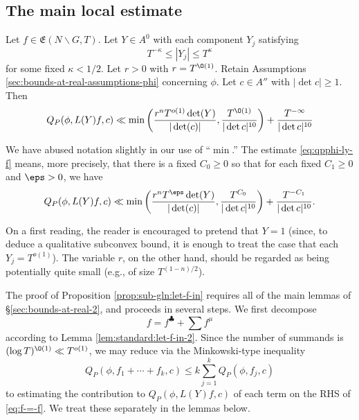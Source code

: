 \subsection{The main local estimate}\label{sec:20230514074956}

\begin{proposition}\label{prop:sub-gln:let-f-in}
  Let $f \in \mathfrak{E}(N \backslash G, T)$.  Let $Y \in A^0$ with each component $Y_j$ satisfying
  \begin{equation}\label{eq:t-kappa-leq}
    T^{-\kappa} \leq |Y_j| \leq T^{\kappa}
  \end{equation}
  for some fixed $\kappa < 1/2$.  Let $r > 0$ with $r = T^{\O(1)}$.  Retain Assumptions \ref{sec:bounds-at-real-assumptions-phi} concerning $\phi$.  Let $c \in A''$ with $|\det c| \geq 1$.  Then
  \begin{equation}\label{eq:qpphi-ly-f}
    Q_P(\phi, L(Y) f, c)
    \ll
    \min
    \left(
      \frac{r^n T^{o(1)} \det(Y)}{|\det (c)|} ,
      \frac{T^{\O(1)}}{|\det c|^{10}}
    \right)
    +
    \frac{T^{-\infty }}{|\det c|^{10}}
  \end{equation}
\end{proposition}
We have abused notation slightly in our use of ``$\min$.''  The estimate \eqref{eq:qpphi-ly-f} means, more precisely, that there is a fixed $C_0 \geq 0$ so that for each fixed $C_1 \geq 0$ and $\eps > 0$, we have
\begin{equation*}
  Q_P(\phi, L(Y) f, c)
  \ll
  \min
  \left(
    \frac{r^n T^{\eps} \det(Y)}{|\det (c)|},
    \frac{T^{C_0}}{|\det c|^{10}}
  \right)
  +
  \frac{T^{-C_1 }}{|\det c|^{10}}.
\end{equation*}

On a first reading, the reader is encouraged to pretend that $Y = 1$ (since, to deduce a qualitative subconvex bound, it is enough to treat the case that each $Y_j = T^{o(1)}$).  The variable $r$, on the other hand, should be regarded as being potentially quite small (e.g., of size $T^{(1-n)/2}$).

The proof of Proposition \ref{prop:sub-gln:let-f-in} requires all of the main lemmas of \S\ref{sec:bounds-at-real-2}, and proceeds in several steps.  We first decompose
\begin{equation}\label{eq:f-=-f}
  f = f^{\clubsuit} + \sum f^\mu
\end{equation}
according to Lemma \ref{lem:standard:let-f-in-2}.  Since the number of summands is $(\log T)^{\O(1)} \ll T^{o(1)}$, we may reduce via the Minkowski-type inequality
\begin{equation*}
  Q_P(\phi, f_1 + \dotsb + f_k, c)
  \leq
  k
  \sum_{j=1}^k
  Q_P(\phi, f_j, c)
\end{equation*}
to estimating the contribution to $Q_P(\phi,L(Y) f,c)$ of each term on the RHS of \eqref{eq:f-=-f}.  We treat these separately in the lemmas below.




